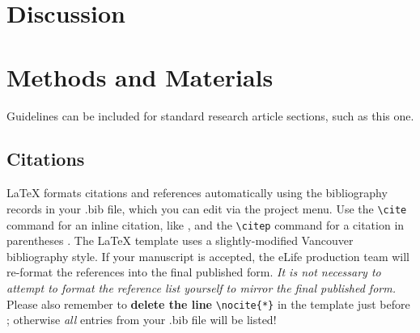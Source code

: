 \documentclass[9pt,lineno]{elife}
\begin{document}






\section{Discussion}

\lipsum[9]

\section{Methods and Materials}

Guidelines can be included for standard research article sections, such as this one. 

\lipsum[3]





\subsection{Citations}

LaTeX formats citations and references automatically using the bibliography records in your .bib file, which you can edit via the project menu. Use the \verb|\cite| command for an inline citation, like \cite{Aivazian917}, and the \verb|\citep| command for a citation in parentheses \citep{Aivazian917}. The LaTeX template uses a slightly-modified Vancouver bibliography style. If your manuscript is accepted, the eLife production team will re-format the references into the final published form. \emph{It is not necessary to attempt to format the reference list yourself to mirror the final published form.} Please also remember to \textbf{delete the line} \verb|\nocite{*}| in the template just before \verb||; otherwise \emph{all} entries from your .bib file will be listed! 
\end{document}
